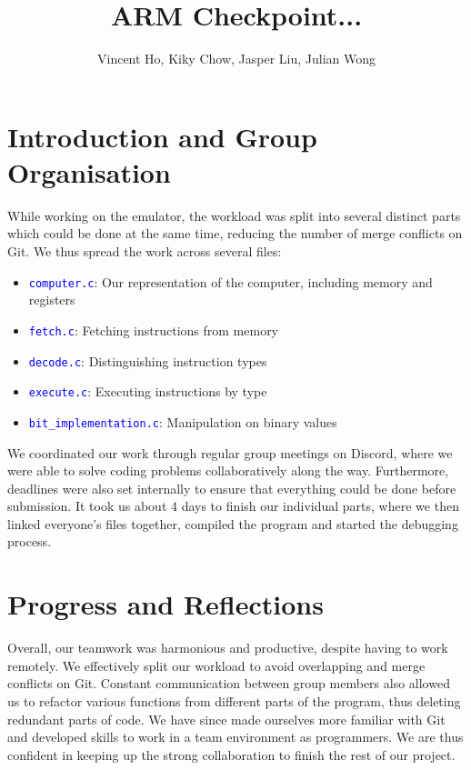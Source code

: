 \documentclass[11pt]{article}
\title{ARM Checkpoint... }
\author{Vincent Ho, Kiky Chow, Jasper Liu, Julian Wong}
\newcommand{\code}[1]{\mbox{\texttt{\textcolor{blue}{#1}}}}
\begin{document}
\maketitle

\section{Introduction and Group Organisation}

While working on the emulator, the workload was split into several distinct parts which could be done at the same time, reducing the number of merge conflicts on Git. We thus spread the work across several files:

\begin{itemize}
\item \code{computer.c}: Our representation of the computer, including memory and registers
\item \code{fetch.c}: Fetching instructions from memory
\item \code{decode.c}: Distinguishing instruction types
\item \code{execute.c}: Executing instructions by type
\item \code{bit\_implementation.c}: Manipulation on binary values
\end{itemize}

We coordinated our work through regular group meetings on Discord, where we were able to solve coding problems collaboratively along the way. Furthermore, deadlines were also set internally to ensure that everything could be done before submission. It took us about 4 days to finish our individual parts, where we then linked everyone's files together, compiled the program and started the debugging process.

\section{Progress and Reflections}

Overall, our teamwork was harmonious and productive, despite having to work remotely. We effectively split our workload to avoid overlapping and merge conflicts on Git. Constant communication between group members also allowed us to refactor various functions from different parts of the program, thus deleting redundant parts of code. We have since made ourselves more familiar with Git and developed skills to work in a team environment as programmers. We are thus confident in keeping up the strong collaboration to finish the rest of our project.
\end{document}
